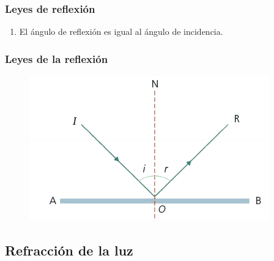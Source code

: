 \documentclass[14pt]{beamer}
\begin{document}
\begin{frame}
\frametitle{Leyes de reflexión}
\begin{enumerate}[<+->]
\conti
\item El ángulo de reflexión es igual al ángulo de incidencia.
\end{enumerate}
\end{frame}
\begin{frame}
\frametitle{Leyes de la reflexión}
\begin{figure}
    \centering
    \includegraphics[scale=0.8]{Imagenes/Optica_Reflexion_01.png}
\end{figure}
\end{frame}

\subsection{Refracción de la luz}
\end{document}
